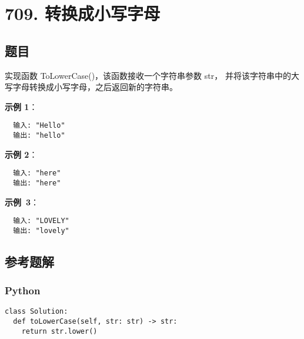 \newpage
\section{709. 转换成小写字母}
\label{leetcode:709}

\subsection{题目}

实现函数 ToLowerCase()，该函数接收一个字符串参数 str，
并将该字符串中的大写字母转换成小写字母，之后返回新的字符串。

\textbf{示例 1}：

\begin{verbatim}
  输入: "Hello"
  输出: "hello"
\end{verbatim}

\textbf{示例 2}：

\begin{verbatim}
  输入: "here"
  输出: "here"
\end{verbatim}

\textbf{示例 3}：

\begin{verbatim}
  输入: "LOVELY"
  输出: "lovely"
\end{verbatim}

\subsection{参考题解}

\subsubsection{Python}

\begin{verbatim}
class Solution:
  def toLowerCase(self, str: str) -> str:
    return str.lower()
\end{verbatim}
